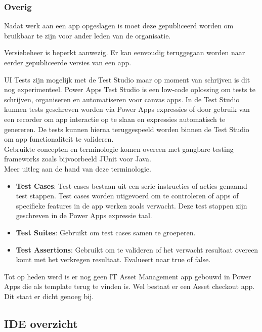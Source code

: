 \subsubsection{Overig}
\label{subsec:overig}

Nadat werk aan een app opgeslagen is moet deze gepubliceerd worden om bruikbaar te zijn voor ander leden van de organisatie.

Versiebeheer is beperkt aanwezig. Er kan eenvoudig teruggegaan worden naar eerder gepubliceerde versies van een app.

UI Tests zijn mogelijk met de Test Studio maar op moment van schrijven is dit nog experimenteel. Power Apps Test Studio is een low-code oplossing om tests te schrijven, organiseren en automatiseren voor canvas apps. In de Test Studio kunnen tests geschreven worden via Power Apps expressies of door gebruik van een recorder om app interactie op te slaan en expressies automatisch te genereren. De tests kunnen hierna teruggespeeld worden binnen de Test Studio om app functionaliteit te valideren. \\ 
Gebruikte concepten en terminologie komen overeen met gangbare testing frameworks zoals bijvoorbeeld JUnit voor Java. \\
Meer uitleg aan de hand van deze terminologie. 
\begin{itemize}
    \item \textbf{Test Cases}: Test cases bestaan uit een serie instructies of acties genaamd test stappen. Test cases worden utigevoerd om te controleren of apps of specifieke features in de app werken zoals verwacht. Deze test stappen zijn geschreven in de Power Apps expressie taal.
    \item \textbf{Test Suites}: Gebruikt om test cases samen te groeperen.
    \item \textbf{Test Assertions}: Gebruikt om te valideren of het verwacht resultaat overeen komt met het verkregen resultaat. Evalueert naar true of false.
\end{itemize}
\autocite{MicrosoftDocs2019d}

Tot op heden werd is er nog geen IT Asset Management app gebouwd in Power Apps die als template terug te vinden is. Wel bestaat er een Asset checkout app. Dit staat er dicht genoeg bij. \autocite{Meganathan2019}

\subsection{IDE overzicht}

